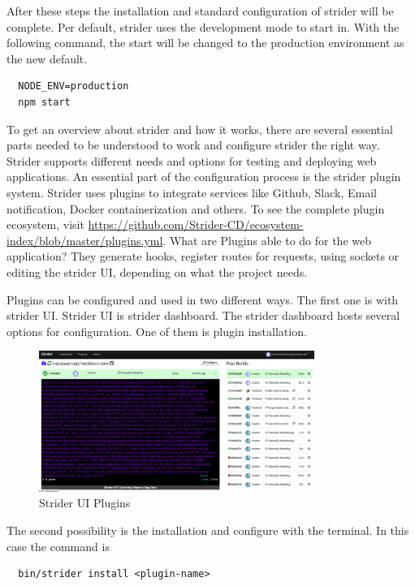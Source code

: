 After these steps the installation and standard configuration of strider will be complete. Per default, strider uses the development mode to start in.
With the following command, the start will be changed to the production environment as the new default.

\begin{lstlisting}
  NODE_ENV=production
  npm start
\end{lstlisting}

To get an overview about strider and how it works, there are several essential parts needed to be understood to work and configure
strider the right way. Strider supports different needs and options for testing and deploying web applications. An essential part of
the configuration process is the strider plugin system. Strider uses plugins to integrate services like Github, Slack, Email
notification, Docker containerization and others. To see the complete plugin ecosystem, visit \url{https://github.com/Strider-CD/ecosystem-index/blob/master/plugins.yml}.
What are Plugins able to do for the web application? They generate hooks, register routes for requests, using sockets or editing the strider
UI, depending on what the project needs.

Plugins can be configured and used in two different ways. The first one is with strider UI. Strider UI is strider dashboard.
The strider dashboard hosts several options for configuration. One of them is plugin installation.

\begin{figure}[h!]
  \centering
  \includegraphics[width=0.8\textwidth]{images/striderUI.png}
  \caption{Strider UI Plugins}
\end{figure}

The second possibility is the installation and configure with the terminal. In this case the command is

\begin{lstlisting}
  bin/strider install <plugin-name>
\end{lstlisting}

